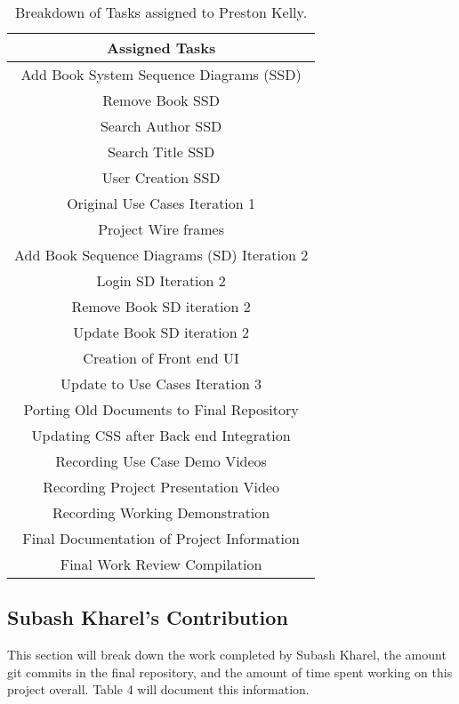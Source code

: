 \documentclass{article}
\begin{document}
	\begin{table}[htbp!]
		\centering
		\begin{tabular}{||c ||} 
			\hline
			Assigned Tasks  \\ [0.5ex] 
			\hline\hline
			Add Book System Sequence Diagrams (SSD)  \\
			Remove Book SSD  \\
			Search Author SSD \\
			Search Title SSD \\
			User Creation SSD \\
			Original Use Cases Iteration 1 \\
			Project Wire frames \\
			Add Book Sequence Diagrams (SD) Iteration 2 \\
			Login SD Iteration 2 \\
			Remove Book SD iteration 2 \\
			Update Book SD iteration 2 \\
			Creation of Front end UI \\ 
			Update to Use Cases Iteration 3 \\
			Porting Old Documents to Final Repository \\
			Updating CSS after Back end Integration \\
			Recording Use Case Demo Videos \\
			Recording Project Presentation Video \\
			Recording Working Demonstration \\
			Final Documentation of Project Information \\
			Final Work Review Compilation \\
			\hline
		\end{tabular}
		\caption{Breakdown of Tasks assigned to Preston Kelly.}
		\label{table:3}
	\end{table}
	
	\subsection{Subash Kharel's Contribution}
	
	This section will break down the work completed by Subash Kharel, the amount git commits in the final repository, and the amount of time spent working on this project overall. Table 4 will document this information. 
	
\end{document}
